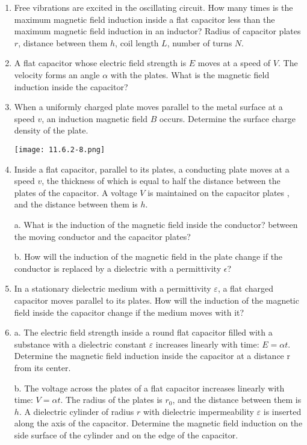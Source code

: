 \documentclass{article}
\begin{document}
\begin{enumerate}[label=11.6.\arabic*]
\item Free vibrations are excited in the oscillating circuit. How many times is the maximum magnetic field induction inside a flat capacitor less than the maximum magnetic field induction in an inductor? Radius of capacitor plates $r$, distance between them $h$, coil length $L$, number of turns $N$.

\item A flat capacitor whose electric field strength is $E$ moves at a speed of $V$. The velocity forms an angle $\alpha$ with the plates. What is the magnetic field induction inside the capacitor?

\item When a uniformly charged plate moves parallel to the metal surface at a speed $v$, an induction magnetic field $B$ occurs. Determine the surface charge density of the plate.

\begin{center}
    \texttt{[image: 11.6.2-8.png]}
\end{center}


\item Inside a flat capacitor, parallel to its plates, a conducting plate moves at a speed $v$, the thickness of which is equal to half the distance between the plates of the capacitor. A voltage $V$ is maintained on the capacitor plates , and the distance between them is $h$.

a. What is the induction of the magnetic field inside the conductor? between the moving conductor and the capacitor plates? 

b. How will the induction of the magnetic field in the plate change if the conductor is replaced by a dielectric with a permittivity $\epsilon$?

\item In a stationary dielectric medium with a permittivity $\varepsilon$, a flat charged capacitor moves parallel to its plates. How will the induction of the magnetic field inside the capacitor change if the medium moves with it?

\item a. The electric field strength inside a round flat capacitor filled with a substance with a dielectric constant $\varepsilon$ increases linearly with time: $E = \alpha t$. Determine the magnetic field induction inside the capacitor at a distance r from its center. 

b. The voltage across the plates of a flat capacitor increases linearly with time: $V = \alpha t$. The radius of the plates is $r_0$, and the distance between them is $h$. A dielectric cylinder of radius $r$ with dielectric impermeability $\varepsilon$ is inserted along the axis of the capacitor. Determine the magnetic field induction on the side surface of the cylinder and on the edge of the capacitor.


\end{enumerate}
\end{document}
